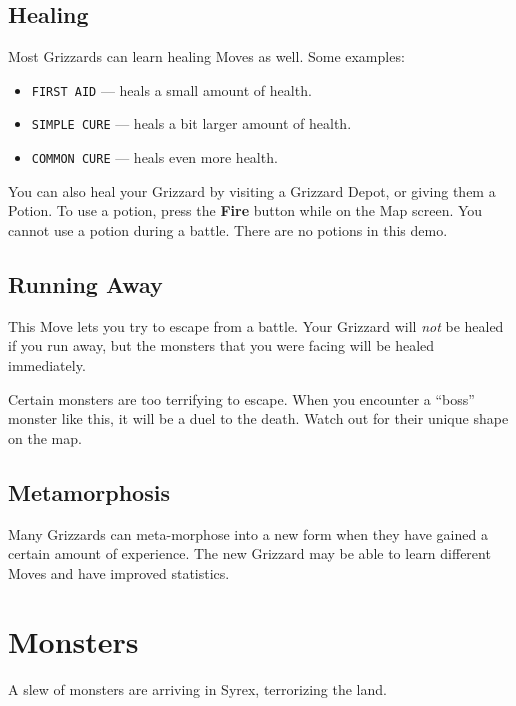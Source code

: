 \documentclass[9pt,twocolumn,openany,article]{memoir}
\newenvironment{ritemize}{\begin{itemize}\raggedright}{\end{itemize}}
\begin{document}
\section{Healing}

Most Grizzards can learn healing Moves as well. Some examples:

\begin{ritemize}
\item \texttt{FIRST AID} --- heals a small amount of health.
\item \texttt{SIMPLE CURE} --- heals a bit larger amount of health.
\item \texttt{COMMON CURE} --- heals even more health.
\end{ritemize}

You can also heal your Grizzard  by visiting a Grizzard Depot, or giving
them a Potion. To use a  potion, press the \textbf{Fire} button while on
the Map screen. You cannot use a potion during a battle. \ifdefined\DEMO
There are no potions in this demo. \fi

\section{Running Away}

This  Move lets  you try  to escape  from a  battle. Your  Grizzard will
\emph{not} be  healed if you  run away, but  the monsters that  you were
facing will be healed immediately.

Certain  monsters  are too  terrifying  to  escape. When  you  encounter
a ``boss'' monster like this, it will  be a duel to the death. Watch out
for their unique shape on the map.

\section{Metamorphosis}

Many  Grizzards can  meta-morphose into  a  new form  when they  have
gained a certain  amount of experience. The new Grizzard  may be able to
learn different Moves and have improved statistics.

\chapter{Monsters}

A slew of monsters are arriving in Syrex, terrorizing the land.
\end{document}
